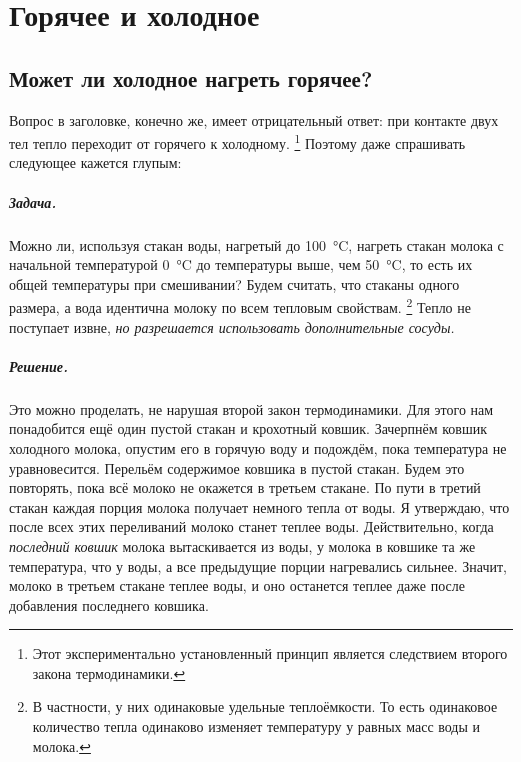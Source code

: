 \chapter{Горячее и холодное}

\section{Может ли холодное нагреть горячее?}

Вопрос в заголовке, конечно же, имеет отрицательный ответ: при контакте двух тел тепло переходит от горячего к холодному.%
\footnote{Этот экспериментально установленный принцип является следствием второго закона термодинамики.}
Поэтому даже спрашивать следующее кажется глупым:

\paragraph{Задача.}
Можно ли, используя стакан воды, нагретый до 100~°C, нагреть стакан молока с начальной температурой 0~°C до температуры выше, чем 50~°C, то есть их общей температуры при смешивании?
Будем считать, что стаканы одного размера, а вода идентична молоку по всем тепловым свойствам.%
\footnote{В частности, у них одинаковые удельные теплоёмкости.
То есть одинаковое количество тепла одинаково изменяет температуру у равных масс воды и молока.}
Тепло не поступает извне, \emph{но разрешается использовать дополнительные сосуды.}

\paragraph{Решение.}
Это можно проделать, не нарушая второй закон термодинамики.
Для этого нам понадобится ещё один пустой стакан и крохотный ковшик.
Зачерпнём ковшик холодного молока, опустим его в горячую воду и подождём, пока температура не уравновесится.
Перельём содержимое ковшика в пустой стакан.
Будем это повторять, пока всё молоко не окажется в третьем стакане.
По пути в третий стакан каждая порция молока получает немного тепла от воды.
Я утверждаю, что после всех этих переливаний молоко станет теплее воды.
Действительно, когда \emph{последний ковшик} молока вытаскивается из воды, у молока в ковшике та же температура, что у воды, а все предыдущие порции нагревались сильнее.
Значит, молоко в третьем стакане теплее воды, и оно останется теплее даже после добавления последнего ковшика.

